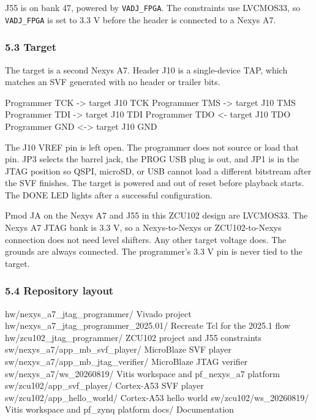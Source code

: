 \documentclass[
  11pt,
  a4paper,
]{article}
\newenvironment{Shaded}{}{}
\newcommand{\NormalTok}[1]{#1}
\begin{document}
J55 is on bank 47, powered by \texttt{VADJ\_FPGA}. The constraints use
LVCMOS33, so \texttt{VADJ\_FPGA} is set to 3.3 V before the header is
connected to a Nexys A7.

\subsubsection{5.3 Target}\label{target}

The target is a second Nexys A7. Header J10 is a single-device TAP,
which matches an SVF generated with no header or trailer bits.

\begin{Shaded}
\begin{Highlighting}[]
\NormalTok{Programmer TCK  {-}\textgreater{}  target J10 TCK}
\NormalTok{Programmer TMS  {-}\textgreater{}  target J10 TMS}
\NormalTok{Programmer TDI  {-}\textgreater{}  target J10 TDI}
\NormalTok{Programmer TDO  \textless{}{-}  target J10 TDO}
\NormalTok{Programmer GND \textless{}{-}\textgreater{}  target J10 GND}
\end{Highlighting}
\end{Shaded}

The J10 VREF pin is left open. The programmer does not source or load
that pin. JP3 selects the barrel jack, the PROG USB plug is out, and JP1
is in the JTAG position so QSPI, microSD, or USB cannot load a different
bitstream after the SVF finishes. The target is powered and out of reset
before playback starts. The DONE LED lights after a successful
configuration.

Pmod JA on the Nexys A7 and J55 in this ZCU102 design are LVCMOS33. The
Nexys A7 JTAG bank is 3.3 V, so a Nexys-to-Nexys or ZCU102-to-Nexys
connection does not need level shifters. Any other target voltage does.
The grounds are always connected. The programmer's 3.3 V pin is never
tied to the target.

\subsubsection{5.4 Repository layout}\label{repository-layout}

\begin{Shaded}
\begin{Highlighting}[]
\NormalTok{hw/nexys\_a7\_jtag\_programmer/             Vivado project}
\NormalTok{hw/nexys\_a7\_jtag\_programmer\_2025.01/     Recreate Tcl for the 2025.1 flow}
\NormalTok{hw/zcu102\_jtag\_programmer/               ZCU102 project and J55 constraints}
\NormalTok{sw/nexys\_a7/app\_mb\_svf\_player/           MicroBlaze SVF player}
\NormalTok{sw/nexys\_a7/app\_mb\_jtag\_verifier/        MicroBlaze JTAG verifier}
\NormalTok{sw/nexys\_a7/ws\_20260819/                 Vitis workspace and pf\_nexys\_a7 platform}
\NormalTok{sw/zcu102/app\_svf\_player/                Cortex{-}A53 SVF player}
\NormalTok{sw/zcu102/app\_hello\_world/               Cortex{-}A53 hello world}
\NormalTok{sw/zcu102/ws\_20260819/                   Vitis workspace and pf\_zynq platform}
\NormalTok{docs/                                    Documentation}
\end{Highlighting}
\end{Shaded}
\end{document}
